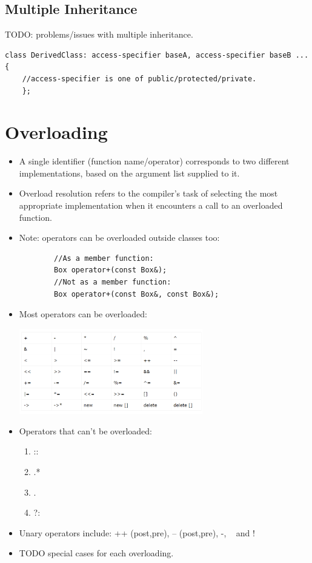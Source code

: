 \documentclass{report}
\begin{document}
\subsection{Multiple Inheritance}
TODO: problems/issues with multiple inheritance.
\begin{lstlisting}[caption=Syntax]
    class DerivedClass: access-specifier baseA, access-specifier baseB ... {
    //access-specifier is one of public/protected/private.
    };
\end{lstlisting}
\section{Overloading}
\begin{itemize}
    \item A single identifier (function name/operator) corresponds to two different implementations, based on the argument list supplied to it.
    \item Overload resolution refers to the compiler's task of selecting the most appropriate implementation when it encounters a call to an overloaded function.
    \item Note: operators can be overloaded outside classes too:
    \begin{lstlisting}
        //As a member function:
        Box operator+(const Box&);
        //Not as a member function:
        Box operator+(const Box&, const Box&);
    \end{lstlisting}
    \item Most operators can be overloaded:
    \begin{center}
        \includegraphics[width=8cm]{rsrc/overloadableops.png}
    \end{center}
    \item Operators that can't be overloaded:
    \begin{enumerate}
        \item ::
        \item .*
        \item .
        \item ?:
    \end{enumerate}
    \item Unary operators include: ++ (post,pre), -- (post,pre), -, ~ and !
    \item TODO special cases for each overloading.
\end{itemize}
\end{document}
